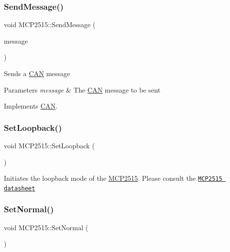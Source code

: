 \subsubsection{\texorpdfstring{Send\+Message()}{SendMessage()}}
{\footnotesize\ttfamily void M\+C\+P2515\+::\+Send\+Message (\begin{DoxyParamCaption}\item[{\hyperlink{struct_c_a_n___m_e_s_s_a_g_e}{C\+A\+N\+\_\+\+M\+E\+S\+S\+A\+GE} \&}]{message }\end{DoxyParamCaption})\hspace{0.3cm}{\ttfamily [virtual]}}

Sends a \hyperlink{class_c_a_n}{C\+AN} message 
\begin{DoxyParams}{Parameters}
{\em message} & The \hyperlink{class_c_a_n}{C\+AN} message to be sent \\
\hline
\end{DoxyParams}


Implements \hyperlink{class_c_a_n_a9149d0118ae9de4a8dc0b807f7c34b1a}{C\+AN}.

\hypertarget{class_m_c_p2515_a7aac5fdb713b83933391348f1188f2b9}{}\label{class_m_c_p2515_a7aac5fdb713b83933391348f1188f2b9} 
\subsubsection{\texorpdfstring{Set\+Loopback()}{SetLoopback()}}
{\footnotesize\ttfamily void M\+C\+P2515\+::\+Set\+Loopback (\begin{DoxyParamCaption}{ }\end{DoxyParamCaption})}

Initiates the loopback mode of the \hyperlink{class_m_c_p2515}{M\+C\+P2515}. Please consult the \href{http://ww1.microchip.com/downloads/en/DeviceDoc/21801G.pdf}{\tt M\+C\+P2515 datasheet} \hypertarget{class_m_c_p2515_a58601a9d30863ebac441d641ddfac44e}{}\label{class_m_c_p2515_a58601a9d30863ebac441d641ddfac44e} 
\subsubsection{\texorpdfstring{Set\+Normal()}{SetNormal()}}
{\footnotesize\ttfamily void M\+C\+P2515\+::\+Set\+Normal (\begin{DoxyParamCaption}{ }\end{DoxyParamCaption})}

